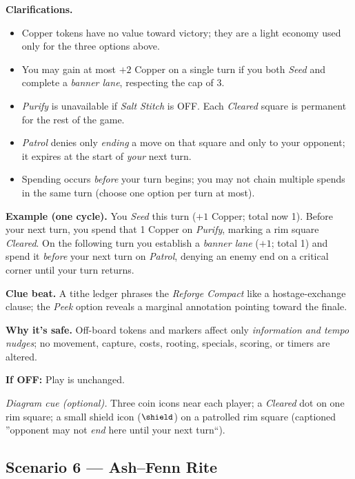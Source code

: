 \documentclass[11pt]{article}
\numberwithin{equation}{section} %
\theoremstyle{plain} %
\theoremstyle{definition} %
\theoremstyle{remark} %
\begin{document}
\medskip
\noindent\textbf{Clarifications.}
\begin{itemize}\setlength\itemsep{0.25em}
  \item Copper tokens have no value toward victory; they are a light economy used only for the three options above.
  \item You may gain at most \(+2\) Copper on a single turn if you both \emph{Seed} and complete a \emph{banner lane}, respecting the cap of 3.
  \item \textit{Purify} is unavailable if \emph{Salt Stitch} is \textsc{OFF}. Each \emph{Cleared} square is permanent for the rest of the game.
  \item \textit{Patrol} denies only \emph{ending} a move on that square and only to your opponent; it expires at the start of \emph{your} next turn.
  \item Spending occurs \emph{before} your turn begins; you may not chain multiple spends in the same turn (choose one option per turn at most).
\end{itemize}

\medskip
\noindent\textbf{Example (one cycle).}  
You \emph{Seed} this turn (\(+1\) Copper; total now 1). Before your next turn, you spend that 1 Copper on \emph{Purify}, marking a rim square \emph{Cleared}. On the following turn you establish a \emph{banner lane} (\(+1\); total 1) and spend it \emph{before} your next turn on \emph{Patrol}, denying an enemy end on a critical corner until your turn returns.

\medskip
\noindent\textbf{Clue beat.} A tithe ledger phrases the \emph{Reforge Compact} like a hostage-exchange clause; the \emph{Peek} option reveals a marginal annotation pointing toward the finale.

\medskip
\noindent\textbf{Why it's safe.} Off-board tokens and markers affect only \emph{information and tempo nudges}; no movement, capture, costs, rooting, specials, scoring, or timers are altered.

\medskip
\noindent\textbf{If \textsc{OFF}:} Play is unchanged.

\medskip
\noindent\textit{Diagram cue (optional).} Three coin icons near each player; a \emph{Cleared} dot on one rim square; a small shield icon (\(\small\shield\)) on a patrolled rim square (captioned ''opponent may not \emph{end} here until your next turn``).

\subsection{Scenario 6 --- Ash--Fenn Rite}
\label{scen:ash-fenn-rite}
\end{document}
